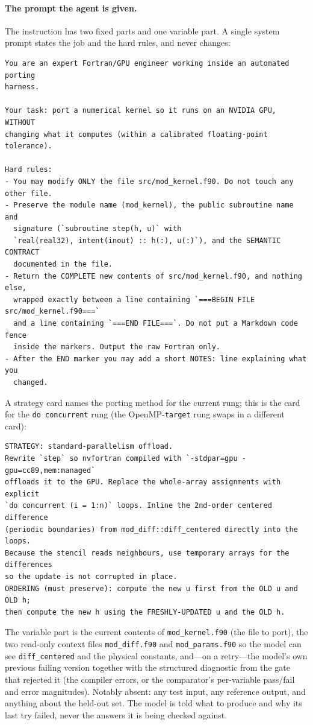 \documentclass[11pt]{article}
\newcommand{\code}[1]{\texttt{#1}}
\begin{document}
\paragraph{The prompt the agent is given.}
The instruction has two fixed parts and one variable part. A single system
prompt states the job and the hard rules, and never changes:

{\small
\begin{verbatim}
You are an expert Fortran/GPU engineer working inside an automated porting
harness.

Your task: port a numerical kernel so it runs on an NVIDIA GPU, WITHOUT
changing what it computes (within a calibrated floating-point tolerance).

Hard rules:
- You may modify ONLY the file src/mod_kernel.f90. Do not touch any other file.
- Preserve the module name (mod_kernel), the public subroutine name and
  signature (`subroutine step(h, u)` with
  `real(real32), intent(inout) :: h(:), u(:)`), and the SEMANTIC CONTRACT
  documented in the file.
- Return the COMPLETE new contents of src/mod_kernel.f90, and nothing else,
  wrapped exactly between a line containing `===BEGIN FILE src/mod_kernel.f90===`
  and a line containing `===END FILE===`. Do not put a Markdown code fence
  inside the markers. Output the raw Fortran only.
- After the END marker you may add a short NOTES: line explaining what you
  changed.
\end{verbatim}
}

\noindent A strategy card names the porting method for the current rung; this is
the card for the \code{do concurrent} rung (the OpenMP-\code{target} rung swaps
in a different card):

{\small
\begin{verbatim}
STRATEGY: standard-parallelism offload.
Rewrite `step` so nvfortran compiled with `-stdpar=gpu -gpu=cc89,mem:managed`
offloads it to the GPU. Replace the whole-array assignments with explicit
`do concurrent (i = 1:n)` loops. Inline the 2nd-order centered difference
(periodic boundaries) from mod_diff::diff_centered directly into the loops.
Because the stencil reads neighbours, use temporary arrays for the differences
so the update is not corrupted in place.
ORDERING (must preserve): compute the new u first from the OLD u and OLD h;
then compute the new h using the FRESHLY-UPDATED u and the OLD h.
\end{verbatim}
}

\noindent The variable part is the current contents of \code{mod\_kernel.f90}
(the file to port), the two read-only context files \code{mod\_diff.f90} and
\code{mod\_params.f90} so the model can see \code{diff\_centered} and the physical
constants, and---on a retry---the model's own previous failing version together
with the structured diagnostic from the gate that rejected it (the compiler
errors, or the comparator's per-variable pass/fail and error magnitudes). Notably
absent: any test input, any reference output, and anything about the held-out
set. The model is told what to produce and why its last try failed, never the
answers it is being checked against.
\end{document}
